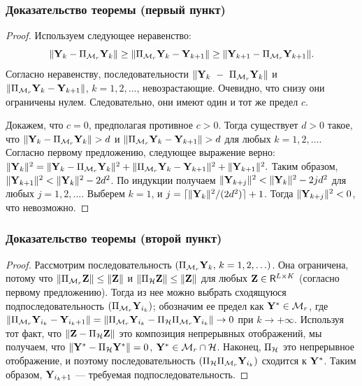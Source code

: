 \documentclass[unicode, notheorems]{beamer}
\begin{document}
\begin{frame}
	\frametitle{Доказательство теоремы (первый пункт)}
	\begin{proof} \small
    Используем следующее неравенство:
    \begin{equation*}
    \|\mathbf{Y}_k - \Pi_{\mathcal{M}_r} \mathbf{Y}_k\| \ge \|\Pi_{\mathcal{M}_r} \mathbf{Y}_k - \mathbf{Y}_{k + 1}\| \ge \|\mathbf{Y}_{k+1} - \Pi_{\mathcal{M}_r} \mathbf{Y}_{k + 1}\|.
    \end{equation*}
    Согласно неравенству, последовательности $\|\mathbf{Y}_k~-~\Pi_{\mathcal{M}_r} \mathbf{Y}_k\|$ и $\|\Pi_{\mathcal{M}_r} \mathbf{Y}_k - \mathbf{Y}_{k + 1}\|$, $k = 1, 2, \ldots$, невозрастающие. Очевидно, что снизу они ограничены нулем.  Следовательно, они имеют один и тот же предел $c$.
	
    Докажем, что $c = 0$, предполагая противное $c > 0$. Тогда существует $d > 0$ такое, что $\|\mathbf{Y}_k - \Pi_{\mathcal{M}_r} \mathbf{Y}_k\| > d$ и $\|\Pi_{\mathcal{M}_r} \mathbf{Y}_k - \mathbf{Y}_{k + 1}\| > d$ для любых $k = 1, 2, \ldots$. Согласно первому предложению, следующее выражение верно:
	$\|\mathbf{Y}_k\|^2 = \|\mathbf{Y}_k - \Pi_{\mathcal{M}_r} \mathbf{Y}_k\|^2 + \|\Pi_{\mathcal{M}_r} \mathbf{Y}_k - \mathbf{Y}_{k + 1}\|^2 + \|\mathbf{Y}_{k + 1}\|^2.$
	Таким образом, $\|\mathbf{Y}_{k+1}\|^2 < \|\mathbf{Y}_k\|^2 - 2d^2$. По индукции получаем $\|\mathbf{Y}_{k+j}\|^2 < \|\mathbf{Y}_k\|^2 - 2 j d^2$ для любых $j = 1, 2, \ldots$. Выберем $k = 1$, и $j = \lceil \|\mathbf{Y}_k\|^2 / (2d^2) \rceil + 1$. Тогда $\|\mathbf{Y}_{k+j}\|^2 < 0$, что невозможно.
	\end{proof}
\end{frame}

\begin{frame}
	\frametitle{Доказательство теоремы (второй пункт)}
	\begin{proof}
		Рассмотрим последовательность $(\Pi_{\mathcal{M}_r} \mathbf{Y}_k,\, k = 1, 2, \ldots)$. Она ограничена, потому что $\|\Pi_{\mathcal{M}_r} \mathbf{Z}\| \le \|\mathbf{Z}\|$ и $\|\Pi_{\mathcal{H}} \mathbf{Z}\| \le \|\mathbf{Z}\|$ для любых $\mathbf{Z} \in \mathsf{R}^{L \times K}$ (согласно первому предложению). Тогда из нее можно выбрать сходящуюся подпоследовательность $(\Pi_{\mathcal{M}_r} \mathbf{Y}_{i_k})$; обозначим ее предел как $\mathbf{Y}^*\in\mathcal{M}_r$, где $\|\Pi_{\mathcal{M}_r} \mathbf{Y}_{i_k} - \mathbf{Y}_{i_k + 1}\| = \|\Pi_{\mathcal{M}_r} \mathbf{Y}_{i_k} - \Pi_{\mathcal{H}} \Pi_{\mathcal{M}_r} \mathbf{Y}_{i_k}\| \to 0$ при $k \to + \infty$. Используя тот факт, что $\|\mathbf{Z} - \Pi_{\mathcal{H}} \mathbf{Z}\|$ это композиция непрерывных отображений, мы получаем, что $\|\mathbf{Y}^* - \Pi_{\mathcal{H}} \mathbf{Y}^*\| = 0$, $\mathbf{Y}^* \in \mathcal{M}_r \cap \mathcal{H}$. Наконец, $\Pi_{\mathcal{H}}$ это непрерывное отображение, и поэтому последовательность $(\Pi_{\mathcal{H}} \Pi_{\mathcal{M}_r} \mathbf{Y}_{i_k})$ сходится к $\mathbf{Y}^*$. Таким образом, $\mathbf{Y}_{i_k + 1}$ --- требуемая подпоследовательность.
	\end{proof}
\end{frame}
\end{document}
